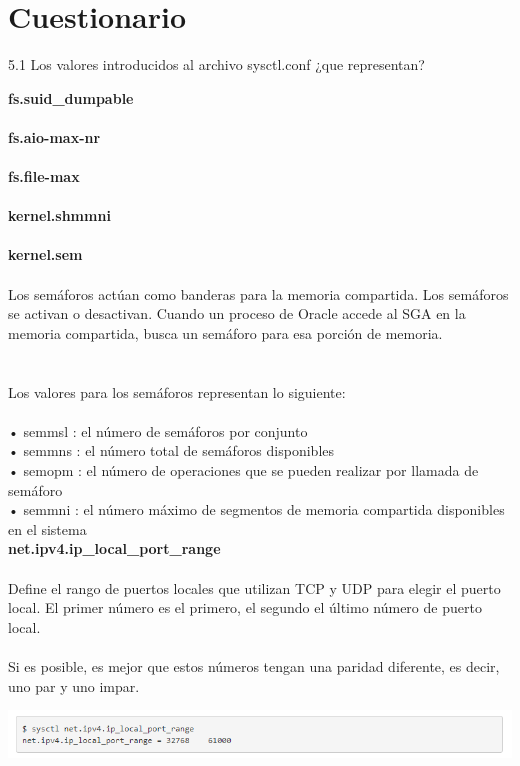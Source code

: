 \section{Cuestionario} 
\vspace{\baselineskip}
5.1 Los valores introducidos al archivo sysctl.conf ¿que representan?

\vspace{\baselineskip}

{\bfseries fs.suid\_dumpable}
\\
\\

{\bfseries fs.aio-max-nr}
\\
\\

{\bfseries fs.file-max}
\\
\\

{\bfseries kernel.shmmni}
\\
\\

{\bfseries  kernel.sem}
\\
\\Los semáforos actúan como banderas para la memoria compartida. Los semáforos se activan o desactivan. Cuando un proceso de Oracle accede al SGA en la memoria compartida, busca un semáforo para esa porción de memoria. \\
\\
\\Los valores para los semáforos representan lo siguiente:\\
\\•	semmsl : el número de semáforos por conjunto
\\•	semmns : el número total de semáforos disponibles
\\•	semopm : el número de operaciones que se pueden realizar por llamada de semáforo
\\•	semmni : el número máximo de segmentos de memoria compartida disponibles en el sistema
\\

{\bfseries  net.ipv4.ip\_local\_port\_range}
\\
\\Define el rango de puertos locales que utilizan TCP y UDP para elegir el puerto local. El primer número es el primero, el segundo el último número de puerto local. \\
\\Si es posible, es mejor que estos números tengan una paridad diferente, es decir, uno par y uno impar. 
\\
	\begin{center}
		\includegraphics[width=17cm]{./Imagenes/c} 
	\end{center} 

